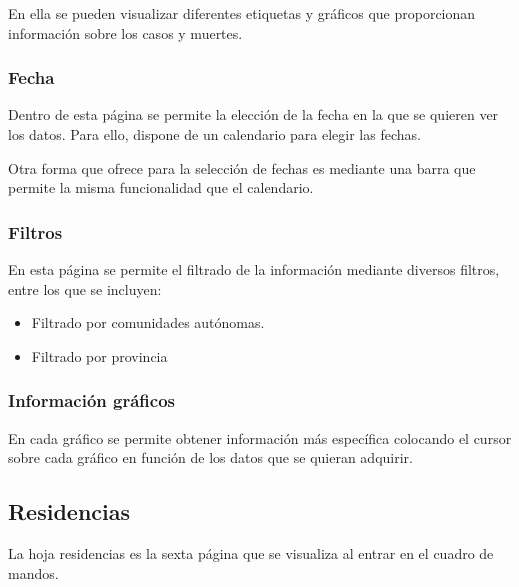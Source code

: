 En ella se pueden visualizar diferentes etiquetas y gráficos que proporcionan información sobre los casos y muertes.

\subsubsection{Fecha}
Dentro de esta página se permite la elección de la fecha en la que se quieren ver los datos.
Para ello, dispone de un calendario para elegir las fechas.

Otra forma que ofrece para la selección de fechas es mediante una barra que permite la misma funcionalidad que el calendario.


\subsubsection{Filtros}
En esta página se permite el filtrado de la información mediante diversos filtros, entre los que se incluyen:
\begin{itemize}
    \item Filtrado por comunidades autónomas.
    \item Filtrado por provincia
\end{itemize}

\subsubsection{Información gráficos}
En cada gráfico se permite obtener información más específica colocando el cursor sobre cada gráfico en función de los datos que se quieran adquirir.



\subsection{Residencias}
La hoja residencias es la sexta página que se visualiza al entrar en el cuadro de mandos.

